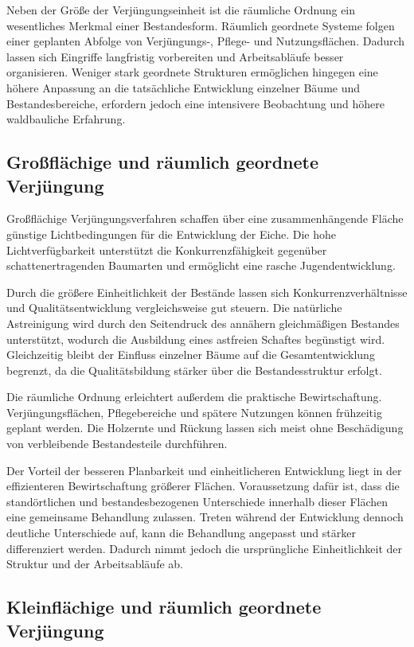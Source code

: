 \documentclass[twocolumn, bibliography=totoc, abstract=true]{scrartcl}
\begin{document}
Neben der Größe der Verjüngungseinheit ist die räumliche Ordnung ein wesentliches Merkmal einer Bestandesform. Räumlich geordnete Systeme folgen einer geplanten Abfolge von Verjüngungs-, Pflege- und Nutzungsflächen. Dadurch lassen sich Eingriffe langfristig vorbereiten und Arbeitsabläufe besser organisieren. Weniger stark geordnete Strukturen ermöglichen hingegen eine höhere Anpassung an die tatsächliche Entwicklung einzelner Bäume und Bestandesbereiche, erfordern jedoch eine intensivere Beobachtung und höhere waldbauliche Erfahrung.

\subsection{Großflächige und räumlich geordnete Verjüngung}

Großflächige Verjüngungsverfahren schaffen über eine zusammenhängende Fläche günstige Lichtbedingungen für die Entwicklung der Eiche. Die hohe Lichtverfügbarkeit unterstützt die Konkurrenzfähigkeit gegenüber schattenertragenden Baumarten und ermöglicht eine rasche Jugendentwicklung.

Durch die größere Einheitlichkeit der Bestände lassen sich Konkurrenzverhältnisse und Qualitätsentwicklung vergleichsweise gut steuern. Die natürliche Astreinigung wird durch den Seitendruck des annähern gleichmäßigen Bestandes unterstützt, wodurch die Ausbildung eines astfreien Schaftes begünstigt wird. Gleichzeitig bleibt der Einfluss einzelner Bäume auf die Gesamtentwicklung begrenzt, da die Qualitätsbildung stärker über die Bestandesstruktur erfolgt.

Die räumliche Ordnung erleichtert außerdem die praktische Bewirtschaftung. Verjüngungsflächen, Pflegebereiche und spätere Nutzungen können frühzeitig geplant werden. Die Holzernte und Rückung lassen sich meist ohne Beschädigung von verbleibende Bestandesteile durchführen.

Der Vorteil der besseren Planbarkeit und einheitlicheren Entwicklung liegt in der effizienteren Bewirtschaftung größerer Flächen. Voraussetzung dafür ist, dass die standörtlichen und bestandesbezogenen Unterschiede innerhalb dieser Flächen eine gemeinsame Behandlung zulassen. Treten während der Entwicklung dennoch deutliche Unterschiede auf, kann die Behandlung angepasst und stärker differenziert werden. Dadurch nimmt jedoch die ursprüngliche Einheitlichkeit der Struktur und der Arbeitsabläufe ab.

\subsection{Kleinflächige und räumlich geordnete Verjüngung}
\end{document}
